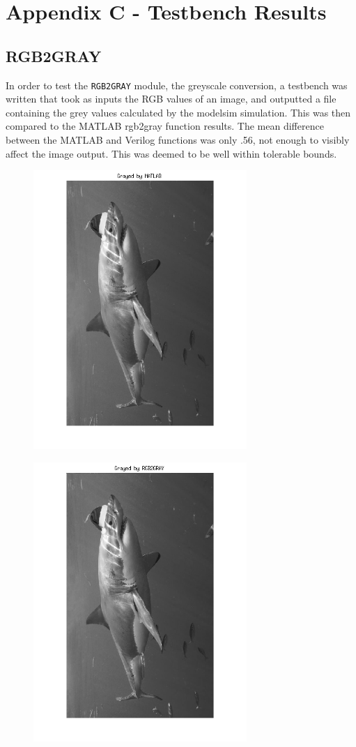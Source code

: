 \documentclass[12pt]{article}
\begin{document}
  \newpage
  \newpage
  \section{Appendix C - Testbench Results}
  \subsection{RGB2GRAY}
    In order to test the \texttt{RGB2GRAY} module, the greyscale conversion, a testbench was written that took as inputs the RGB values of an image, and outputted a file containing the grey values calculated by the modelsim simulation. This was then compared to the MATLAB rgb2gray function results. The mean difference between the MATLAB and Verilog functions was only .56, not enough to visibly affect the image output. This was deemed to be well within tolerable bounds.
\begin{figure}[H]
  \centering
  \includegraphics[height=300pt, angle=-90]{Images/RGB2GRAY/MATLAB.png}
\end{figure}
\begin{figure}[H]
  \centering
  \includegraphics[height=300pt, angle=-90]{Images/RGB2GRAY/Verilog.png}
\end{figure}
\end{document}
